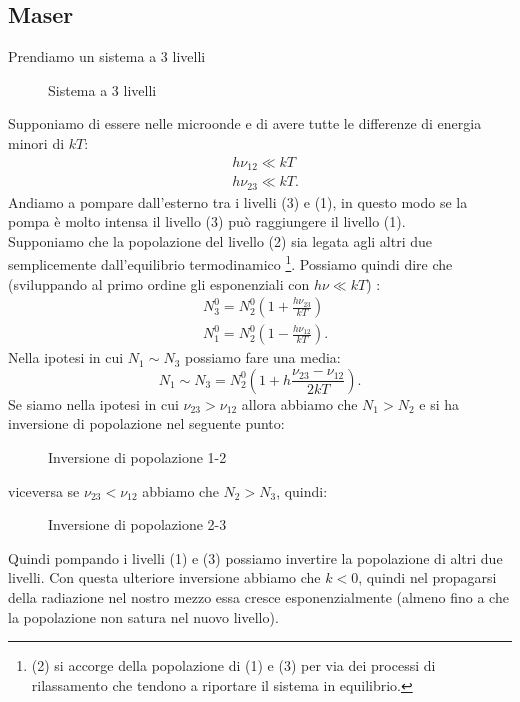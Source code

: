 \subsection{Maser}%
\label{sub:Maser}
Prendiamo un sistema a 3 livelli
\begin{figure}[ht]
    \centering
    \caption{Sistema a 3 livelli}
    \label{fig:sistema-a-3-livelli}
\end{figure}
Supponiamo di essere nelle microonde e di avere tutte le differenze di energia minori di $kT$:
\[\begin{aligned}
    &h\nu_{12}\ll kT\\
    &h\nu_{23}\ll kT
.\end{aligned}\] 
Andiamo a pompare dall'esterno tra i livelli (3) e (1), in questo modo se la pompa è molto intensa il livello (3) può raggiungere il livello (1).\\
Supponiamo che la popolazione del livello (2) sia legata agli altri due semplicemente dall'equilibrio termodinamico 
\footnote{(2) si accorge della popolazione di (1) e (3) per via dei processi di rilassamento che tendono a riportare il sistema in equilibrio.}.
Possiamo quindi dire che (sviluppando al primo ordine gli esponenziali con $h\nu\ll kT$) :
\[\begin{aligned}
    &N_3^0 = N_2^0\left(1+ \frac{h\nu_{23}}{kT}\right)\\
    &N_1^0 = N_2^0\left(1-\frac{h\nu_{12}}{kT}\right)
.\end{aligned}\]
Nella ipotesi in cui $N_1\sim N_3$ possiamo fare una media:
\[
    N_1\sim N_3 = N_2^0\left(1+ h \frac{\nu_{23}-\nu_{12}}{2kT}\right)
.\] 
Se siamo nella ipotesi in cui $\nu_{23}>\nu_{12}$ allora abbiamo che $N_1>N_2$ e si ha inversione di popolazione nel seguente punto:
\begin{figure}[H]
    \centering
    \caption{Inversione di popolazione 1-2}
    \label{fig:inversione-di-popolazione-1-2}
\end{figure}
\noindent
viceversa se $\nu_{23}<\nu_{12}$ abbiamo che $N_2>N_3$, quindi:
\begin{figure}[H]
    \centering
    \caption{Inversione di popolazione 2-3}
    \label{fig:inversione-di-popolazione-2-3}
\end{figure}
\noindent
Quindi pompando i livelli (1) e (3) possiamo invertire la popolazione di altri due livelli. 
Con questa ulteriore inversione abbiamo che $k<0$, quindi nel propagarsi della radiazione nel nostro mezzo essa cresce esponenzialmente (almeno fino a che la popolazione non satura nel nuovo livello). \\
